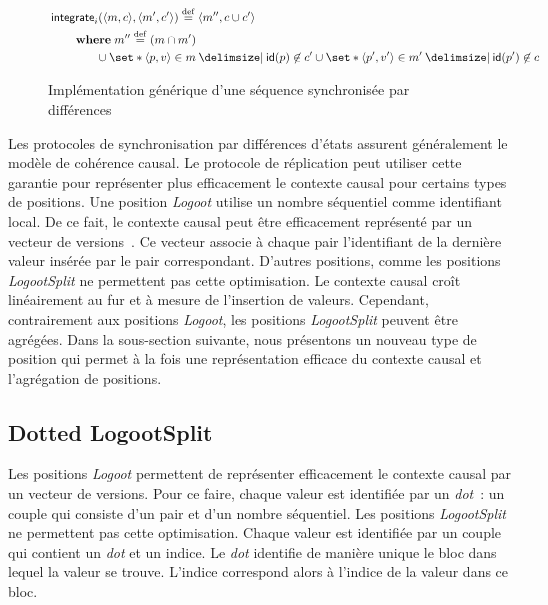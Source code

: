 \begin{figure}[htb]
\begin{align}
    &\begin{aligned}
    \MoveEqLeft \trm{integrate}_i(\tuple*{m,c}, \tuple*{m',c'}) \defeq \tuple*{m'',c \cup c'}\\
        &\begin{aligned}
        \MoveEqLeft\where m'' \defeq (m \cap m')\\
        & \cup \set*{\tuple*{p, v} \in m\given \trm{id}(p) \not\in c'} \cup \set*{\tuple*{p', v'} \in m' \given \trm{id}(p') \not\in c}
        \end{aligned}
    \end{aligned}\label{eq:deltaseq-integr}
    \end{align}
    \caption{Implémentation générique d'une séquence synchronisée par différences}\label{fig:deltaseq}
\end{figure}

Les protocoles de synchronisation par différences d'états assurent généralement le modèle de cohérence causal.
Le protocole de réplication peut utiliser cette garantie pour représenter plus efficacement le contexte causal pour certains types de positions.
Une position \emph{Logoot} utilise un nombre séquentiel comme identifiant local.
De ce fait, le contexte causal peut être efficacement représenté par un vecteur de versions~\autocite{parker_1983_versionvector,mattern_1988_timevector}.
Ce vecteur associe à chaque pair l'identifiant de la dernière valeur insérée par le pair correspondant.
D'autres positions, comme les positions \emph{LogootSplit} ne permettent pas cette optimisation.
Le contexte causal croît linéairement au fur et à mesure de l'insertion de valeurs.
Cependant, contrairement aux positions \emph{Logoot}, les positions \emph{LogootSplit} peuvent être agrégées.
Dans la sous-section suivante, nous présentons un nouveau type de position qui permet à la fois une représentation efficace du contexte causal et l'agrégation de positions.


\subsection{Dotted LogootSplit}\label{subsec:dotted-logootsplit}

Les positions \emph{Logoot} permettent de représenter efficacement le contexte causal par un vecteur de versions.
Pour ce faire, chaque valeur est identifiée par un \emph{dot}~: un couple qui consiste d'un pair et d'un nombre séquentiel.
Les positions \emph{LogootSplit} ne permettent pas cette optimisation.
Chaque valeur est identifiée par un couple qui contient un \emph{dot} et un indice.
Le \emph{dot} identifie de manière unique le bloc dans lequel la valeur se trouve.
L'indice correspond alors à l'indice de la valeur dans ce bloc.

